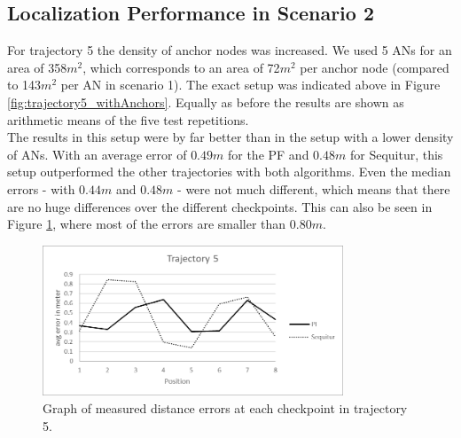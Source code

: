 \subsection{Localization Performance in Scenario 2}
For trajectory 5 the density of anchor nodes was increased. We used 5 ANs for an area of 358$m^2$, which corresponds to an area of 72$m^2$ per anchor node (compared to 143$m^2$ per AN in scenario 1). The exact setup was indicated above in Figure \ref{fig:trajectory5_withAnchors}. Equally as before the results are shown as arithmetic means of the five test repetitions.\\
\noindent\hspace*{5mm}%
The results in this setup were by far better than in the setup with a lower density of ANs. With an average error of $0.49m$ for the PF and $0.48m$ for Sequitur, this setup outperformed the other trajectories with both algorithms. Even the median errors - with $0.44m$ and $0.48m$ -  were not much different, which means that there are no huge differences over the different checkpoints. This can also be seen in Figure \ref{fig:trajectory5_results}, where most of the errors are smaller than $0.80m$.

\begin{figure}[th]
\centering
\includegraphics[width=0.8\textwidth]{Figures/trajectory5_results}
\decoRule
\caption[Positioning Results Trajectory 5]{Graph of measured distance errors at each checkpoint in trajectory 5.}
\label{fig:trajectory5_results}
\end{figure}

